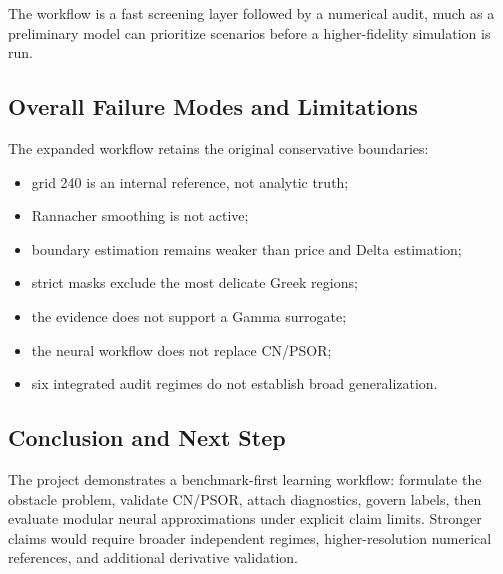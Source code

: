 \begin{readerintuition}
The workflow is a fast screening layer followed by a numerical audit, much as
a preliminary model can prioritize scenarios before a higher-fidelity
simulation is run.
\end{readerintuition}

\subsection{Overall Failure Modes and Limitations}
The expanded workflow retains the original conservative boundaries:
\begin{itemize}
  \item grid 240 is an internal reference, not analytic truth;
  \item Rannacher smoothing is not active;
  \item boundary estimation remains weaker than price and Delta estimation;
  \item strict masks exclude the most delicate Greek regions;
  \item the evidence does not support a Gamma surrogate;
  \item the neural workflow does not replace CN/PSOR;
  \item six integrated audit regimes do not establish broad generalization.
\end{itemize}

\subsection{Conclusion and Next Step}
The project demonstrates a benchmark-first learning workflow: formulate the
obstacle problem, validate CN/PSOR, attach diagnostics, govern labels, then
evaluate modular neural approximations under explicit claim limits. Stronger
claims would require broader independent regimes, higher-resolution numerical
references, and additional derivative validation.
